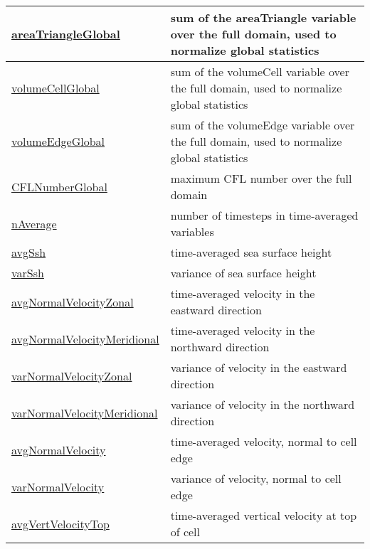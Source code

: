 {\begin{center}
\begin{longtable}{| p{2.0in} | p{4.0in} |}
	\hline
	\hyperref[subsec:var_sec_state_areaTriangleGlobal]{areaTriangleGlobal} & sum of the areaTriangle variable over the full domain, used to normalize global statistics \\
	\hline
	\hyperref[subsec:var_sec_state_volumeCellGlobal]{volumeCellGlobal} & sum of the volumeCell variable over the full domain, used to normalize global statistics \\
	\hline
	\hyperref[subsec:var_sec_state_volumeEdgeGlobal]{volumeEdgeGlobal} & sum of the volumeEdge variable over the full domain, used to normalize global statistics \\
	\hline
	\hyperref[subsec:var_sec_state_CFLNumberGlobal]{CFLNumberGlobal} & maximum CFL number over the full domain \\
	\hline
	\hyperref[subsec:var_sec_state_nAverage]{nAverage} & number of timesteps in time-averaged variables \\
	\hline
	\hyperref[subsec:var_sec_state_avgSsh]{avgSsh} & time-averaged sea surface height \\
	\hline
	\hyperref[subsec:var_sec_state_varSsh]{varSsh} & variance of sea surface height \\
	\hline
	\hyperref[subsec:var_sec_state_avgNormalVelocityZonal]{avgNormalVelocityZonal} & time-averaged velocity in the eastward direction \\
	\hline
	\hyperref[subsec:var_sec_state_avgNormalVelocityMeridional]{avgNormalVelocityMeridional} & time-averaged velocity in the northward direction \\
	\hline
	\hyperref[subsec:var_sec_state_varNormalVelocityZonal]{varNormalVelocityZonal} & variance of velocity in the eastward direction \\
	\hline
	\hyperref[subsec:var_sec_state_varNormalVelocityMeridional]{varNormalVelocityMeridional} & variance of velocity in the northward direction \\
	\hline
	\hyperref[subsec:var_sec_state_avgNormalVelocity]{avgNormalVelocity} & time-averaged velocity, normal to cell edge \\
	\hline
	\hyperref[subsec:var_sec_state_varNormalVelocity]{varNormalVelocity} & variance of velocity, normal to cell edge \\
	\hline
	\hyperref[subsec:var_sec_state_avgVertVelocityTop]{avgVertVelocityTop} & time-averaged vertical velocity at top of cell \\
	\hline
\end{longtable}
\end{center}
}

